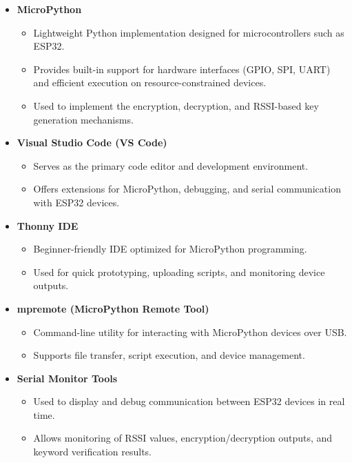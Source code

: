 \begin{itemize}
    \item \textbf{MicroPython} 
    \begin{itemize}
            \item Lightweight Python implementation designed for microcontrollers such as ESP32.
             \item Provides built-in support for hardware interfaces (GPIO, SPI, UART) and efficient execution on resource-constrained devices.
            \item Used to implement the encryption, decryption, and RSSI-based key generation mechanisms.

        \end{itemize} 
    \item \textbf{Visual Studio Code (VS Code)} 
        \begin{itemize} 
            \item Serves as the primary code editor and development environment.
            \item Offers extensions for MicroPython, debugging, and serial communication with ESP32 devices.
        \end{itemize} 

    \item \textbf{Thonny IDE} 
        \begin{itemize} 
            \item Beginner-friendly IDE optimized for MicroPython programming.
            \item  Used for quick prototyping, uploading scripts, and monitoring device outputs.
        \end{itemize} 
 

    \item \textbf{mpremote (MicroPython Remote Tool)} 
      \begin{itemize} 
            \item Command-line utility for interacting with MicroPython devices over USB.
            \item Supports file transfer, script execution, and device management.
        \end{itemize} 
         \item \textbf{Serial Monitor Tools} 
      \begin{itemize} 
            \item Used to display and debug communication between ESP32 devices in real time.
            \item Allows monitoring of RSSI values, encryption/decryption outputs, and keyword verification results.
        \end{itemize}
\end{itemize}

